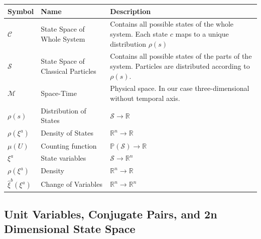 \documentclass{article}
\begin{document}
\begin{center}
\renewcommand{\arraystretch}{1.6}
 \begin{tabular}{p{} p{} p{}}
 \hline
 Symbol & Name & Description \\ [0.5ex] 
 \hline\hline
 $\mathcal{C}$ & State Space of Whole System & Contains all possible states of the whole system. Each state $c$ maps to a unique distribution $\rho(s)$\\ [2ex]
 \hline
 $\mathcal{S}$ & State Space of Classical Particles & Contains all possible states of the parts of the system. Particles are distributed according to $\rho(s)$. \\ [2ex]
 \hline
 $\mathcal{M}$ & Space-Time & Physical space. In our case three-dimensional without temporal axis. \\ [2ex] 
 \hline
 $\rho(s)$ & Distribution of States & $\mathcal{S} \to \mathbb{R}$ \\
 \hline
 $\rho(\xi^a)$ & Density of States & $\mathbb{R}^n \to \mathbb{R}$ \\
 \hline
 $\mu(U)$ & Counting function & $\mathbb{P}(\mathcal{S}) \to \mathbb{R}$ \\
 \hline
 $\xi^a$ & State variables & $\mathcal{S} \to \mathbb{R}^n$ \\
 \hline
 $\rho(\xi^a)$ & Density & $\mathbb{R}^n \to \mathbb{R}$ \\
 \hline
 $\hat{\xi}^b(\xi^a)$ & Change of Variables & $\mathbb{R}^n \to \mathbb{R}^n$ \\ [1ex] 
 \hline
\end{tabular}
\end{center}

\subsection{Unit Variables, Conjugate Pairs, and 2n Dimensional State Space}
\end{document}
